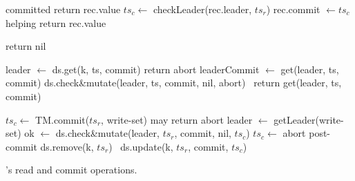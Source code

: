 \begin{algorithm}[t]
  \begin{algorithmic}
    \small
		 \Comment committed
     			   \State return rec.value \EndIf
 			\State $ts_c \leftarrow$ {\sc checkLeader}(rec.leader, $ts_r$)
   			\State rec.commit $\leftarrow ts_c$ \Comment helping 
 			   \State return  rec.value \EndIf
      		\EndIf
      		


      \EndFor
      \State  return nil
      \EndProcedure

\Statex


      				\State leader $\leftarrow$ ds.get(k, ts, commit)
     				 	 return abort  
     				 \EndIf 		
     				 leaderCommit $\leftarrow$ get(leader, ts, commit)       	 	
     				    
					\State ds.check\&mutate(leader, ts, commit, nil, abort)
				\Else\ return get(leader, ts, commit)  %
				\EndIf 		     	 	
		     	 \EndWhile
	   	\EndProcedure
\Statex

      
      	\State $ts_c \leftarrow$ TM.commit($ts_r$, write-set) \Comment may return abort
		\State leader  $\leftarrow$ getLeader(write-set)
	      	 \State  ok $\leftarrow$ ds.check\&mutate(leader, $ts_r$, commit, nil,  $ts_c$)
   		 $ts_c \leftarrow$ abort \EndIf
	\EndIf
	\State \Comment post-commit
			 ds.remove(k, $ts_r$)  	
			\Else\ ds.update(k, $ts_r$, commit, $ts_c$)
			\EndIf
	\EndFor
\EndProcedure
      
  \end{algorithmic}
  \caption{\sys's read and commit operations.} 
  \label{fig:get-pseudocode}
\end{algorithm} 



